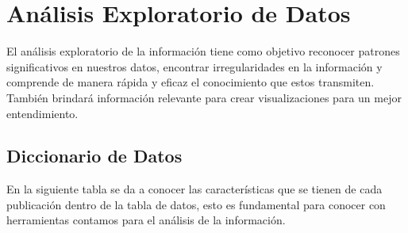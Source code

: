 \documentclass{report}
\begin{document}
    \chapter{Análisis Exploratorio de Datos}
    El análisis exploratorio de la información tiene como objetivo reconocer patrones significativos en nuestros datos, encontrar irregularidades en la información y comprende de manera rápida y eficaz el conocimiento que estos transmiten. También brindará información relevante para crear visualizaciones para un mejor entendimiento.
    
    \section{Diccionario de Datos}
    En la siguiente tabla se da a conocer las características que se tienen de cada publicación dentro de la tabla de datos, esto es fundamental para conocer con herramientas contamos para el análisis de la información.
    
\end{document}
